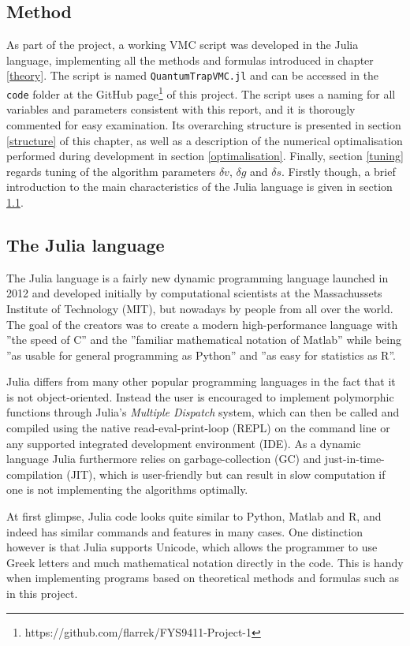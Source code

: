 \documentclass[a4paper,8pt]{article}
\begin{document}
\begin{multicols}{2}
\section{Method}\label{method}
As part of the project, a working VMC script was developed in the Julia language, implementing all the methods and formulas introduced in chapter \ref{theory}. The script is named \texttt{QuantumTrapVMC.jl} and can be accessed in the \texttt{code} folder at the GitHub page\footnote{https://github.com/flarrek/FYS9411-Project-1} of this project. The script uses a naming for all variables and parameters consistent with this report, and it is thorougly commented for easy examination. Its overarching structure is presented in section \ref{structure} of this chapter, as well as a description of the numerical optimalisation performed during development in section \ref{optimalisation}. Finally, section \ref{tuning} regards tuning of the algorithm parameters $\delta v$, $\delta g$ and $\delta s$. Firstly though, a brief introduction to the main characteristics of the Julia language is given in section \ref{Julia}.


\subsection{The Julia language}\label{Julia}
The Julia language is a fairly new dynamic programming language launched in 2012 and developed initially by computational scientists at the Massachussets Institute of Technology (MIT), but nowadays by people from all over the world. The goal of the creators was to create a modern high-performance language with ''the speed of C'' and the ''familiar mathematical notation of Matlab'' while being ''as usable for general programming as Python'' and ''as easy for statistics as R''.\cite{JuliaGoal}

Julia differs from many other popular programming languages in the fact that it is not object-oriented. Instead the user is encouraged to implement polymorphic functions through Julia's \textit{Multiple Dispatch} system, which can then be called and compiled using the native read-eval-print-loop (REPL) on the command line or any supported integrated development environment (IDE). As a dynamic language Julia furthermore relies on garbage-collection (GC) and just-in-time-compilation (JIT), which is user-friendly but can result in slow computation if one is not implementing the algorithms optimally.

At first glimpse, Julia code looks quite similar to Python, Matlab and R, and indeed has similar commands and features in many cases. One distinction however is that Julia supports Unicode, which allows the programmer to use Greek letters and much mathematical notation directly in the code. This is handy when implementing programs based on theoretical methods and formulas such as in this project.



\end{multicols}
\end{document}
